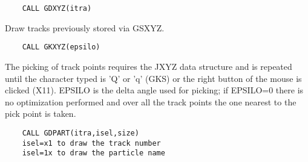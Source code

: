 \ENDCMD


\BEGARG
{}
\ENDARG

\begin{verbatim}
    CALL GDXYZ(itra)
\end{verbatim}
   \par
Draw tracks previously stored via GSXYZ.  

\ENDCMD


\BEGARG
{}
\ENDARG

\begin{verbatim}
    CALL GKXYZ(epsilo)
\end{verbatim}
   \par
The picking of track points requires the JXYZ data structure and is  
   repeated until the character typed is 'Q' or 'q' (GKS) or the right button 
   of the mouse is clicked (X11).  EPSILO is the delta angle used for picking; 
   if EPSILO=0 there is no optimization performed and over all the track 
   points the one nearest to the pick point is taken.  

\ENDCMD


\BEGARG
{}
\ENDARG

\begin{verbatim}
    CALL GDPART(itra,isel,size)
    isel=x1 to draw the track number
    isel=1x to draw the particle name
\end{verbatim}

\ENDCMD


\BEGARG
{}
\ENDARG

